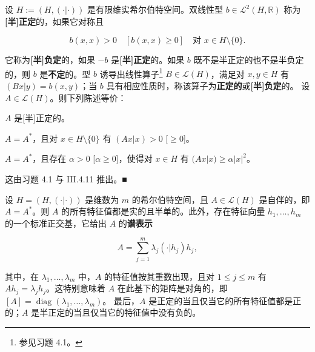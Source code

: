 \begin{remark}

\begin{items}
\item

设 $ H := (H, (\cdot|\cdot)) $ 是有限维实希尔伯特空间。双线性型 $ b \in \mathcal{L}^{2}(H, \mathbb{R}) $ 称为\textbf{[半]正定}的，如果它对称且

\[
b(x, x) > 0 \quad [b(x, x) \ge 0] \quad \text{对 } x \in H\setminus\{0\} .
\]

它称为\textbf{[半]负定}的，如果 $ -b $ 是\textbf{[半]正定}的。如果 $ b $ 既不是半正定的也不是半负定的，则 $ b $ 是\textbf{不定}的。型 $ b $ 诱导出线性算子\footnote{参见习题 4.1。} $ B \in \mathcal{L}(H) $，满足对 $ x, y \in H $ 有 $ (Bx|y) = b(x, y) $；当 $ b $ 具有相应性质时，称该算子为\textbf{正定的}或\textbf{[半]负定}的。
设 $ A \in \mathcal{L}(H) $。则下列陈述等价：

\begin{subitems}
\item

$ A $ 是[半]正定的。

\item

$ A = A^{*} $，且对 $ x \in H\setminus\{0\} $ 有 $ (Ax|x) > 0 $ [$ \ge 0 $]。

\item

$ A = A^{*} $，且存在 $ \alpha > 0 $ [$ \alpha \ge 0 $]，使得对 $ x \in H $ 有 $ (Ax|x) \ge \alpha|x|^{2} $。

\proofhead
这由习题 4.1 与 III.4.11 推出。\nobreak\hspace{0.35em}■
\end{subitems}

\item

设 $ H = (H, (\cdot|\cdot)) $ 是维数为 $ m $ 的希尔伯特空间，且 $ A \in \mathcal{L}(H) $ 是自伴的，即 $ A = A^{*} $。则 $ A $ 的所有特征值都是实的且半单的。此外，存在特征向量 $ h_{1}, \ldots, h_{m} $ 的一个标准正交基，它给出 $ A $ 的\textbf{谱表示}

\begin{equation}
A = \sum_{j=1}^{m}\lambda_{j}(\cdot|h_{j})h_{j} ,\tag{5.6}
\end{equation}

其中，在 $ \lambda_{1}, \ldots, \lambda_{m} $ 中，$ A $ 的特征值按其重数出现，且对 $ 1 \le j \le m $ 有 $ Ah_{j} = \lambda_{j}h_{j} $。这特别意味着 $ A $ 在此基下的矩阵是对角的，即 $ [A] = \operatorname{diag}(\lambda_{1}, \ldots, \lambda_{m}) $。
最后，$ A $ 是正定的当且仅当它的所有特征值都是正的；$ A $ 是半正定的当且仅当它的特征值中没有负的。


\end{items}
\end{remark}
